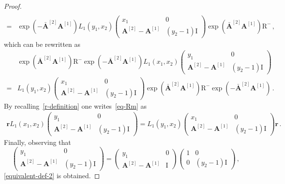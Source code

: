 \documentclass[10pt,a4paper]{amsart}
\newcommand{\ID}{\mathrm{I}}
\newcommand{\OA}{\mathbf{A}}
\newcommand{\OAD}{\mathbf{\bar{A}}}
\newcommand{\abrOSCR}{\mathrm{R}}
\begin{document}
\begin{proof}
\begin{equation}
\begin{split}
		\\=&
		\exp{\left(-\OAD^{[2]}\OA^{[1]}\right)}L_{1}(y_{1},x_{2})\left(\begin{array}{cc}
			x_1&0\\
			\OA^{[2]}-\OA^{[1]}&(y_{2}-1)\ID
		\end{array}\right)\exp{\left(\OAD^{[2]}\OA^{[1]}\right)}\abrOSCR^{-}\,,
	\end{split}
\end{equation}
which can be rewritten as
\begin{equation}
	\begin{split}
		&\exp{\left(\OAD^{[2]}\OA^{[1]}\right)}\abrOSCR^{-}\exp{\left(-\OAD^{[2]}\OA^{[1]}\right)}L_{1}(x_{1},x_{2})\left(\begin{array}{cc}
			y_1&0\\
			\OA^{[2]}-\OA^{[1]}&(y_{2}-1)\ID
		\end{array}\right)
		\\=&
		L_{1}(y_{1},x_{2})\left(\begin{array}{cc}
			x_1&0\\
			\OA^{[2]}-\OA^{[1]}&(y_{2}-1)\ID
		\end{array}\right)\exp{\left(\OAD^{[2]}\OA^{[1]}\right)}\abrOSCR^{-}\exp{\left(-\OAD^{[2]}\OA^{[1]}\right)}\,.
	\end{split}
\end{equation}
By recalling~\eqref{r-definition}
one writes~\eqref{eq-Rm} as
\begin{equation}\label{equivalent-def}
	\begin{split}
		\mathbf{r}L_{1}(x_{1},x_{2})\left(\begin{array}{cc}
			y_1&0\\
			\OA^{[2]}-\OA^{[1]}&(y_{2}-1)\ID
		\end{array}\right)=
		L_{1}(y_{1},x_{2})\left(\begin{array}{cc}
			x_1&0\\
			\OA^{[2]}-\OA^{[1]}&(y_{2}-1)\ID
		\end{array}\right)\mathbf{r}\,.
	\end{split}
\end{equation}
Finally,  observing that
\begin{equation}
	\left(\begin{array}{cc}
			y_1&0\\
			\OA^{[2]}-\OA^{[1]}&(y_{2}-1)\ID
		\end{array}\right)=\left(\begin{array}{cc}
		y_1&0\\
		\OA^{[2]}-\OA^{[1]}&\ID
	\end{array}\right)\left(\begin{array}{cc}
		1&0\\
		0&(y_{2}-1)\ID
	\end{array}\right)\,,
\end{equation}
\eqref{equivalent-def-2} is obtained.


\end{proof}
\end{document}
